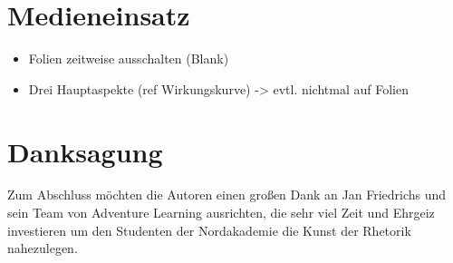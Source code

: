 \documentclass[../main.tex]{subfiles}
\begin{document}
    \section{Medieneinsatz}
    	\begin{itemize}
    		\item Folien zeitweise ausschalten (Blank)
    		\item Drei Hauptaspekte (ref Wirkungskurve) -> evtl. nichtmal auf Folien
    	\end{itemize}
    
    \section*{Danksagung}
    	Zum Abschluss möchten die Autoren einen großen Dank an Jan Friedrichs und sein Team von Adventure Learning ausrichten, die sehr viel Zeit und Ehrgeiz investieren um den Studenten der Nordakademie die Kunst der Rhetorik nahezulegen.
    
\end{document}
